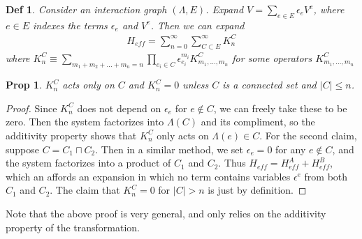 \documentclass[11pt]{article}
\newtheorem{defn}{Def}
\newtheorem{prop}{Prop}
\begin{document}
\begin{defn}
    Consider an interaction graph $(\Lambda, E)$. Expand $V = \sum_{e \in E}\epsilon_e V^e$, where $e \in E$ indexes the terms $\epsilon_e$ and $V^e$. Then we can expand
    \begin{align}
        H_{eff} = \sum_{n = 0}^\infty\sum_{C \subset E}^\infty K_n^C
    \end{align}
    where $K^C_n \equiv \sum_{m_1 + m_2 + \dots + m_n = n}\prod_{e_i \in C}\epsilon_{e_i}^{m_i}K^C_{m_1, \dots, m_n}$
 for some operators $K^C_{m_1, \dots, m_n}$
\end{defn}
\begin{prop}
    $K^C_n$ acts only on $C$ and $K_n^C = 0$ unless $C$ is a connected set and $|C| \leq n$.
\end{prop}
\begin{proof}
    Since $K_n^C$ does not depend on $\epsilon_e$ for $e \notin C$, we can freely take these to be zero. Then the system factorizes into $\Lambda(C)$ and its compliment, so the additivity property shows that $K_n^C$ only acts on $\Lambda(e) \in C$. For the second claim, suppose $C = C_1 \sqcap C_2$. Then in a similar method, we set $\epsilon_e = 0$ for any $e \notin C$, and the system factorizes into a product of $C_1$ and $C_2$. Thus $H_{eff} = H_{eff}^A + H_{eff}^B$, which an affords an expansion in which no term contains variables $\epsilon^e$ from both $C_1$ and $C_2$. The claim that $K_n^C = 0$ for $|C| > n$ is just by definition.
\end{proof}
Note that the above proof is very general, and only relies on the additivity property of the transformation.



\nocite{*}


\end{document}

